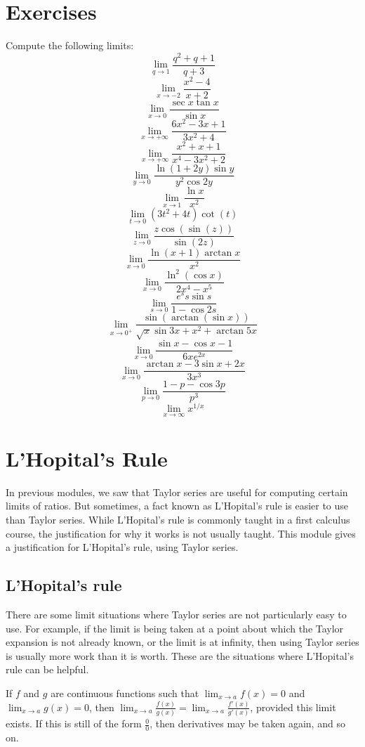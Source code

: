\documentclass[twoside,openright,titlepage,a4paper]{book}
\begin{document}
\begin{sloppypar}
\section{Exercises}
Compute the following limits:
\[ \displaystyle \lim_{q \to 1} \frac{q^2 + q + 1}{q+3} \]
\[ \displaystyle \lim_{x \to -2} \frac {x^2-4}{x+2} \]
\[ \displaystyle \lim_{x \to 0} \frac{\sec x\tan x}{\sin x} \]
\[ \displaystyle \lim_{x \to +\infty} \frac{6x^2 -3x+1}{3x^2+4} \]
\[ \displaystyle \lim_{x \rightarrow +\infty} \frac {x^2+x+1}{x^4-3x^2+2} \]
\[ \displaystyle \lim_{y \to 0} \frac{\ln(1+2y)\sin y}{y^2\cos 2y} \]
\[ \displaystyle \lim_{x\to 1} \frac{\ln x}{x^2} \]
\[ \displaystyle \lim_{t\to 0} (3t^2+4t)\cot(t) \]
\[ \displaystyle \lim_{z\to 0} \frac{z\cos(\sin(z))}{\sin(2z)} \]
\[ \displaystyle \lim_{x \to 0} \frac{\ln (x+1)\arctan x}{x^2} \]
\[ \displaystyle \lim_{x \to 0} \frac{\ln^2(\cos x)}{2x^4-x^5} \]
\[ \displaystyle \lim_{s \to 0} \frac{e^s s \sin s}{1 - \cos 2s} \]
\[ \displaystyle \lim_{x \to 0^+} \frac{\sin(\arctan(\sin x))}{\sqrt{x} \sin 3x +x^2+ \arctan 5x} \]
\[ \displaystyle \lim_{x \to 0} \frac{\sin x -\cos x -1}{6x e^{2x}} \]
\[ \displaystyle \lim_{x \to 0} \frac{\arctan x-3 \sin x +2x}{3x^3} \]
\[ \displaystyle \lim_{p \to 0} \frac{1-p- \cos 3p}{p^3} \]
\[ \displaystyle \lim_{x \to \infty} x^{1/x} \]

\section{L'Hopital's Rule} \label{ChFunctionsSecLHopitalsRule}
In previous modules, we saw that Taylor series are useful for computing certain limits of ratios. But sometimes, a fact known as L'Hopital's rule is easier to use than Taylor series. While L'Hopital's rule is commonly taught in a first calculus course, the justification for why it works is not usually taught. This module gives a justification for L'Hopital's rule, using Taylor series.

\subsection{L'Hopital's rule}
There are some limit situations where Taylor series are not particularly easy to use. For example, if the limit is being taken at a point about which the Taylor expansion is not already known, or the limit is at infinity, then using Taylor series is usually more work than it is worth. These are the situations where L'Hopital's rule can be helpful.
\begin{definitionbox}[title=\textbf{L'Hopital's Rule, $\frac{0}{0}$ case}]
If $f$ and $g$ are continuous functions such that $\displaystyle \lim_{x \rightarrow a} f(x) = 0$ and $\displaystyle\lim_{x \rightarrow a} g(x) = 0$, then $\displaystyle \lim_{x \rightarrow a} \frac{f(x)}{g(x)} = \lim_{x\rightarrow a} \frac{f'(x)}{g'(x)}$, provided this limit exists. If this is still of the form $\frac{0}{0}$, then derivatives may be taken again, and so on.
\end{definitionbox}


\end{sloppypar}
\end{document}
